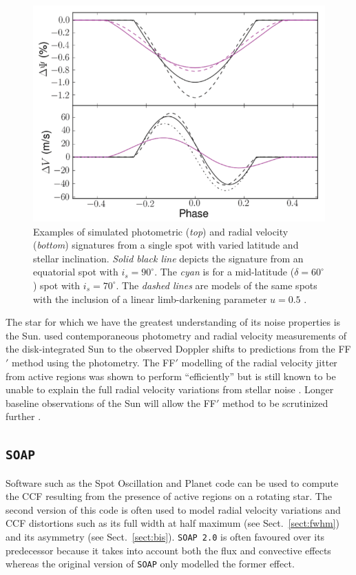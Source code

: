 \begin{figure}
\centering
\includegraphics[scale=.5]{figures/ffprime.png}
\caption{Examples of simulated photometric (\emph{top}) and radial velocity (\emph{bottom}) signatures 
from a single spot with varied latitude and stellar inclination. \emph{Solid black line} depicts the signature 
from an equatorial spot with $i_s=90^{\circ}$. The \emph{cyan} 
is for a mid-latitude ($\delta=60^{\circ}$) spot with 
$i_s=70^{\circ}$. The \emph{dashed lines} are models of the same spots with the inclusion of a linear 
limb-darkening parameter $u=0.5$ \parencite{dorren87}. 
\parencite[Image credit:][]{aigrain12} \label{fig:ffprime}} 
\end{figure}

The star for which we have the greatest understanding of its noise properties is the Sun. 
\cite{dumusque15} used contemporaneous photometry and radial velocity measurements of the 
disk-integrated Sun to the observed Doppler shifts to predictions from the FF$'$ method 
using the photometry. The FF$'$ modelling of the radial velocity jitter from active regions 
was shown to perform ``efficiently'' but is still known to be unable to explain the full 
radial velocity variations from stellar noise \parencite[e.g.][]{aigrain12, haywood14}. 
Longer baseline observations of the Sun will allow the FF$'$ method to be scrutinized further 
\parencite{dumusque15}.

\subsection{\texttt{SOAP}} \label{sect:soap}
Software such as the Spot Oscillation and Planet code 
\parencite[\texttt{SOAP};][]{boisse12} 
can be used to compute the CCF resulting from the presence of active regions on a rotating star. 
The second version of this code \parencite[\texttt{SOAP 2.0};][]{dumusque14} 
is often used to model radial velocity variations and CCF distortions such as its 
full width at half maximum (see Sect.~\ref{sect:fwhm}) and its asymmetry (see Sect.~\ref{sect:bis}). 
\texttt{SOAP 2.0} is often favoured over its predecessor 
because it takes into account both the flux and convective 
effects whereas the original version of \texttt{SOAP} only modelled the former effect. \\

